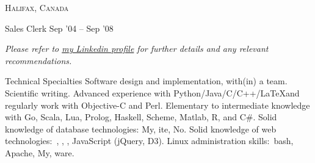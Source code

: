 \documentclass[10pt,a4paper]{article}
\begin{document}
{\textsc{Halifax, Canada}} {

\headedsubsection
{Sales Clerk}
{Sep '04 -- Sep '08}
{}
}

\begin{center}
\textit{Please refer to \href{http://ca.linkedin.com/in/asafatli}{my Linkedin profile} for further details and any relevant recommendations.}
\end{center}

\spacedhrule{-0.2em}{-0.4em} %



\nocite{Latent2012}
\nocite{DCSI2012}
\nocite{Ref2013}
\nocite{Lisbon2015}
\printbibliography[heading=none]

\spacedhrule{0.5em}{-0.4em} %





\spacedhrule{0.5em}{-0.4em} %



\inlineheadsection
{Technical Specialties}
{Software design and implementation, with(in) a team. Scientific writing. Advanced experience with Python/Java/C/C++/\LaTeX and regularly work with Objective-C and Perl. Elementary to intermediate knowledge with Go, Scala, Lua, Prolog, Haskell, Scheme, Matlab, R, and C\#. Solid knowledge of database technologies: My, ite, No. Solid knowledge of web technologies:\ , , , JavaScript (jQuery, D3). Linux administration skills:\ bash, Apache, My, ware.}
\end{document}
